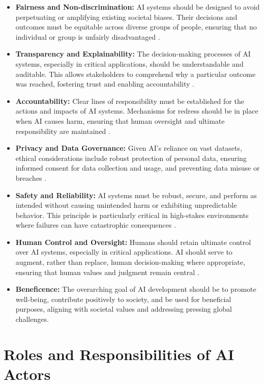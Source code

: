 \begin{itemize}
    \item \textbf{Fairness and Non-discrimination:} AI systems should be designed to avoid perpetuating or amplifying existing societal biases. Their decisions and outcomes must be equitable across diverse groups of people, ensuring that no individual or group is unfairly disadvantaged \parencite{Buolamwini2018GenderShades}.
    \item \textbf{Transparency and Explainability:} The decision-making processes of AI systems, especially in critical applications, should be understandable and auditable. This allows stakeholders to comprehend why a particular outcome was reached, fostering trust and enabling accountability \parencite{Adadi2018ExplainableAI}.
    \item \textbf{Accountability:} Clear lines of responsibility must be established for the actions and impacts of AI systems. Mechanisms for redress should be in place when AI causes harm, ensuring that human oversight and ultimate responsibility are maintained \parencite{NIST2023AIRMF}.
    \item \textbf{Privacy and Data Governance:} Given AI's reliance on vast datasets, ethical considerations include robust protection of personal data, ensuring informed consent for data collection and usage, and preventing data misuse or breaches \parencite{IBM2023DataGovernance}.
    \item \textbf{Safety and Reliability:} AI systems must be robust, secure, and perform as intended without causing unintended harm or exhibiting unpredictable behavior. This principle is particularly critical in high-stakes environments where failures can have catastrophic consequences \parencite{GoogleSAIF2023}.
    \item \textbf{Human Control and Oversight:} Humans should retain ultimate control over AI systems, especially in critical applications. AI should serve to augment, rather than replace, human decision-making where appropriate, ensuring that human values and judgment remain central \parencite{MaximAI2025}.
    \item \textbf{Beneficence:} The overarching goal of AI development should be to promote well-being, contribute positively to society, and be used for beneficial purposes, aligning with societal values and addressing pressing global challenges.
\end{itemize}

\section{Roles and Responsibilities of AI Actors}
\label{sec:roles_and_responsibilities}

